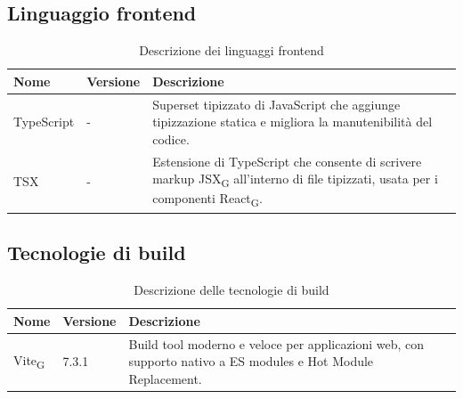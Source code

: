 \documentclass[11pt,a4paper]{article}
\newcommand{\gls}[1]{#1\textsubscript{G}}
\begin{document}
\subsection{Linguaggio frontend}
\begin{table}[H]
    \centering
    \begin{tabular}{|p{}|p{}|p{}|}
        \hline
        \textbf{Nome} & \textbf{Versione} & \textbf{Descrizione} \\
        \hline
        TypeScript & - & Superset tipizzato di JavaScript che aggiunge tipizzazione statica e migliora la manutenibilità del codice. \\
        \hline
        TSX & - & Estensione di TypeScript che consente di scrivere markup \gls{JSX} all'interno di file tipizzati, usata per i componenti \gls{React}. \\
        \hline
    \end{tabular}
    \caption{Descrizione dei linguaggi frontend}
    \label{tab:linguaggi_frontend}
\end{table}

\subsection{Tecnologie di build}
\begin{table}[H]
    \centering
    \begin{tabular}{|p{}|p{}|p{}|}
        \hline
        \textbf{Nome} & \textbf{Versione} & \textbf{Descrizione} \\
        \hline
        \gls{Vite} & 7.3.1 & Build tool moderno e veloce per applicazioni web, con supporto nativo a ES modules e Hot Module Replacement. \\
        \hline
    \end{tabular}
    \caption{Descrizione delle tecnologie di build}
    \label{tab:tecnologie_build}
\end{table}
\end{document}
